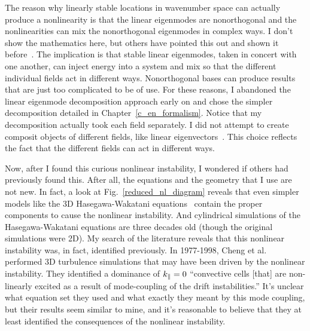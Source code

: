 The reason why linearly stable locations in wavenumber space can actually produce a nonlinearity is that the 
linear eigenmodes are nonorthogonal and the nonlinearities can mix the nonorthogonal eigenmodes in complex ways. 
I don't show the mathematics here, but others have pointed this out and shown it before~\cite{camargo1998,kim2010}. The implication is that stable linear eigenmodes, 
taken in concert with one another, can inject energy into a system and mix so that the different individual fields act in different ways.
Nonorthogonal bases can produce results that are just too complicated to be of use.
For these reasons, I abandoned the linear eigenmode decomposition approach early on and chose the simpler decomposition detailed in Chapter~\ref{c_en_formalism}. 
Notice that my decomposition actually took each field separately. I did not attempt
to create composit objects of different fields, like linear eigenvectors~\cite{baver2002,terry2002,terry2006a,terry2006b,gatto2006,terry2009,kim2010,makwana2011}. This choice reflects
the fact that the different fields can act in different ways.

Now, after I found this curious nonlinear instability, I wondered if others had previously found this. After all, the equations and the geometry that I use are not new. In fact, a look at 
Fig.~\ref{reduced_nl_diagram} reveals that even simpler models like the 3D Hasegawa-Wakatani equations~\cite{hasegawa1983} contain the proper components to cause the nonlinear instability. And 
cylindrical simulations of the Hasegawa-Wakatani equations are three decades old (though the original simulations were 2D).
My search of the literature reveals that this nonlinear instability was, in fact, identified previously. In 1977-1998, Cheng et al.~\cite{cheng1977,cheng1978} performed 3D turbulence simulations
that may have been driven by the nonlinear instability. 
They identified a dominance of $k_\parallel=0$ ``convective cells [that] are non-linearly excited as a result of mode-coupling of the drift instabilities.'' It's unclear what equation set they used
and what exactly they meant by this mode coupling, but their results seem similar to mine, and it's reasonable to believe that they at least identified the consequences of the nonlinear instability.

